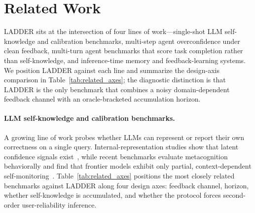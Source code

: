 \documentclass[11pt]{article}
\begin{document}
\section{Related Work}
\label{sec:related}

LADDER sits at the intersection of four lines of work---single-shot LLM self-knowledge and calibration benchmarks, multi-step agent overconfidence under clean feedback, multi-turn agent benchmarks that score task completion rather than self-knowledge, and inference-time memory and feedback-learning systems. We position LADDER against each line and summarize the design-axis comparison in Table~\ref{tab:related_axes}; the diagnostic distinction is that LADDER is the only benchmark that combines a noisy domain-dependent feedback channel with an oracle-bracketed accumulation horizon.

\paragraph{LLM self-knowledge and calibration benchmarks.} A growing line of work probes whether LLMs can represent or report their own correctness on a single query. Internal-representation studies show that latent confidence signals exist~\citep{kadavath2022language, jian2025metacognition, binder2025introspection}, while recent benchmarks evaluate metacognition behaviorally and find that frontier models exhibit only partial, context-dependent self-monitoring~\citep{ackerman2026metacognition, liu2025metacognitive_learning}. Table~\ref{tab:related_axes} positions the most closely related benchmarks against LADDER along four design axes: feedback channel, horizon, whether self-knowledge is accumulated, and whether the protocol forces second-order user-reliability inference.
\end{document}
